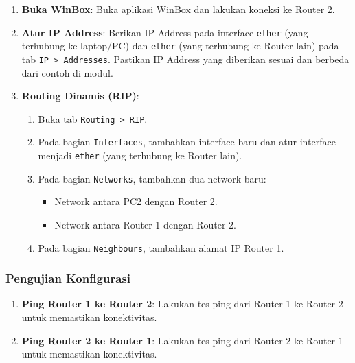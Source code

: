 \begin{enumerate}
    \item \textbf{Buka WinBox}: Buka aplikasi WinBox dan lakukan koneksi ke Router 2.
    \item \textbf{Atur IP Address}: Berikan IP Address pada interface \texttt{ether} (yang terhubung ke laptop/PC) dan \texttt{ether} (yang terhubung ke Router lain) pada tab \texttt{IP > Addresses}. Pastikan IP Address yang diberikan sesuai dan berbeda dari contoh di modul.
    \item \textbf{Routing Dinamis (RIP)}:
    \begin{enumerate}
        \item Buka tab \texttt{Routing > RIP}.
        \item Pada bagian \texttt{Interfaces}, tambahkan interface baru dan atur interface menjadi \texttt{ether} (yang terhubung ke Router lain).
        \item Pada bagian \texttt{Networks}, tambahkan dua network baru:
        \begin{itemize}
            \item Network antara PC2 dengan Router 2.
            \item Network antara Router 1 dengan Router 2.
        \end{itemize}
        \item Pada bagian \texttt{Neighbours}, tambahkan alamat IP Router 1.
    \end{enumerate}
\end{enumerate}

\subsubsection*{Pengujian Konfigurasi}

\begin{enumerate}
    \item \textbf{Ping Router 1 ke Router 2}: Lakukan tes ping dari Router 1 ke Router 2 untuk memastikan konektivitas.
    \item \textbf{Ping Router 2 ke Router 1}: Lakukan tes ping dari Router 2 ke Router 1 untuk memastikan konektivitas.
\end{enumerate}